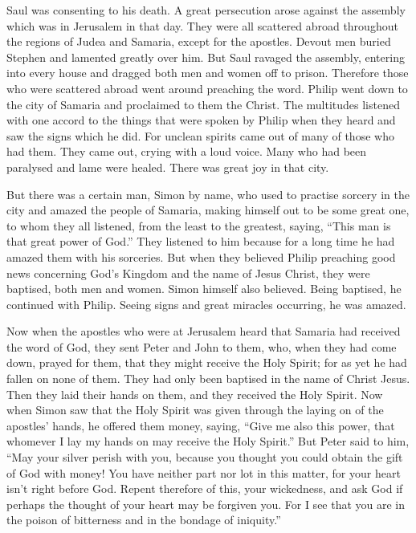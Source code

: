  Saul was consenting to his death. A great persecution arose
against the assembly which was in Jerusalem in that day. They were all
scattered abroad throughout the regions of Judea and Samaria, except for
the apostles.  Devout men buried Stephen and lamented
greatly over him.  But Saul ravaged the assembly, entering
into every house and dragged both men and women off to prison.
 Therefore those who were scattered abroad went around
preaching the word.  Philip went down to the city of Samaria
and proclaimed to them the Christ.  The multitudes listened
with one accord to the things that were spoken by Philip when they heard
and saw the signs which he did.  For unclean spirits came
out of many of those who had them. They came out, crying with a loud
voice. Many who had been paralysed and lame were healed. 
There was great joy in that city.

 But there was a certain man, Simon by name, who used to
practise sorcery in the city and amazed the people of Samaria, making
himself out to be some great one,  to whom they all
listened, from the least to the greatest, saying, ``This man is that
great power of God.''  They listened to him because for a
long time he had amazed them with his sorceries.  But when
they believed Philip preaching good news concerning God's Kingdom and
the name of Jesus Christ, they were baptised, both men and women.
 Simon himself also believed. Being baptised, he continued
with Philip. Seeing signs and great miracles occurring, he was amazed.

 Now when the apostles who were at Jerusalem heard that
Samaria had received the word of God, they sent Peter and John to them,
 who, when they had come down, prayed for them, that they
might receive the Holy Spirit;  for as yet he had fallen on
none of them. They had only been baptised in the name of Christ Jesus.
 Then they laid their hands on them, and they received the
Holy Spirit.  Now when Simon saw that the Holy Spirit was
given through the laying on of the apostles' hands, he offered them
money,  saying, ``Give me also this power, that whomever I
lay my hands on may receive the Holy Spirit.''  But Peter
said to him, ``May your silver perish with you, because you thought you
could obtain the gift of God with money!  You have neither
part nor lot in this matter, for your heart isn't right before God.
 Repent therefore of this, your wickedness, and ask God if
perhaps the thought of your heart may be forgiven you.  For
I see that you are in the poison of bitterness and in the bondage of
iniquity.''

